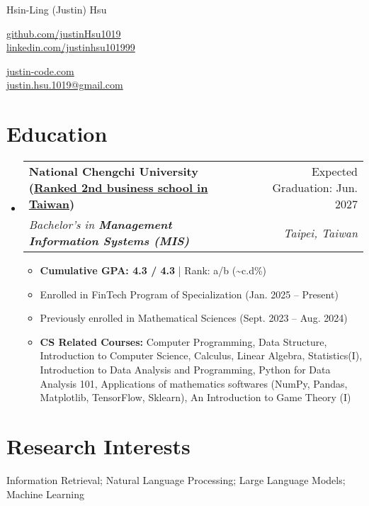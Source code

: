 \documentclass[letterpaper,10pt]{article}
\makeatletter
\newcommand{\resumeItem}[1]{
  \item\small{
    {#1 \vspace{-2pt}}
  }
}
\newcommand{\resumeSubheading}[4]{
  \vspace{-2pt}\item
    \begin{tabular*}{0.97\textwidth}[t]{l@{\extracolsep{\fill}}r}
      \textbf{#1} & #2 \\
      \textit{\small#3} & \textit{\small #4} \\
    \end{tabular*}\vspace{-7pt}
}
\newcommand{\resumeSubHeadingListStart}{\begin{itemize}[leftmargin=0.15in, label={}]}
\newcommand{\resumeSubHeadingListEnd}{\end{itemize}}
\newcommand{\resumeItemListStart}{\begin{itemize}}
\newcommand{\resumeItemListEnd}{\end{itemize}\vspace{-5pt}}
\makeatother
\begin{document}
\begin{center}
    {\LARGE Hsin-Ling (Justin) Hsu} \\ \vspace{2pt}
    \begin{multicols}{2}
    \begin{flushleft}
    \href{{https://github.com/justinHsu1019}}{github.com/justinHsu1019}\\
    \href{{https://www.linkedin.com/in/justinhsu101999}}{linkedin.com/justinhsu101999}
    \end{flushleft}

    \begin{flushright}
    \href{{https://justin-code.com}}{justin-code.com}\\
    \href{mailto:justin.hsu.1019@gmail.com}{justin.hsu.1019@gmail.com}
    \end{flushright}
    \end{multicols}
\end{center}

\vspace{-2pt}
\section{Education}
  \resumeSubHeadingListStart
      \resumeSubheading
      {National Chengchi University \normalfont(\href{https://www.eduniversal-ranking.com/business-school-university-ranking-in-taiwan-region-china.html}{Ranked 2nd business school in Taiwan})}{Expected Graduation: Jun. 2027}
      {Bachelor's in \textbf{Management Information Systems (MIS)}}{Taipei, Taiwan}
      \resumeItemListStart
      \vspace{0.3em}
        \resumeItem{\textbf{Cumulative GPA: 4.3 / 4.3} | Rank: a/b (\textasciitilde c.d\%)}
        \resumeItem{Enrolled in FinTech Program of Specialization (Jan. 2025 -- Present)}
        \resumeItem{Previously enrolled in Mathematical Sciences (Sept. 2023 -- Aug. 2024)}
        \resumeItem{\textbf{CS Related Courses:} Computer Programming, Data Structure, Introduction to Computer Science, Calculus, Linear Algebra, Statistics(I), Introduction to Data Analysis and Programming, Python for Data Analysis 101, Applications of mathematics softwares (NumPy, Pandas, Matplotlib, TensorFlow, Sklearn), An Introduction to Game Theory (I)}
      \resumeItemListEnd
  \resumeSubHeadingListEnd

\section{Research Interests}
Information Retrieval; Natural Language Processing; Large Language Models; Machine Learning
\end{document}
